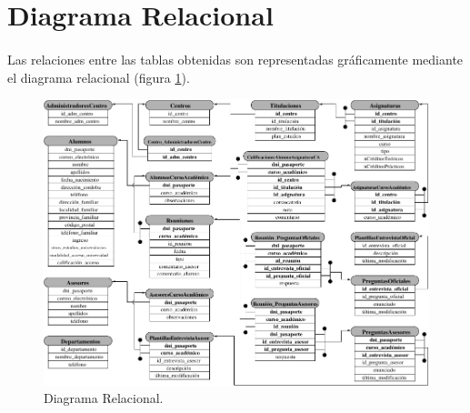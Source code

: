 \newpage

\section{Diagrama Relacional}

  \paragraph{}Las relaciones entre las tablas obtenidas son representadas
  gráficamente mediante el diagrama relacional (figura
  \ref{diagramaRelacional}).

  \begin{figure}[!ht]
            \begin{center}
            \includegraphics[]{10.Disenyo_Datos/10.5.Diagrama_Relacional/diagramaRelacional.pdf}
            \caption{Diagrama Relacional.}
            \label{diagramaRelacional}
            \end{center}
         \end{figure}

